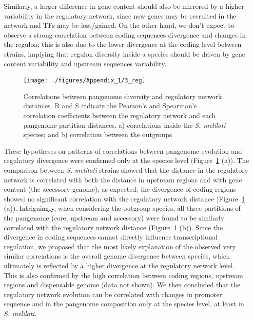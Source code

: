 Similarly, a larger difference in gene content should also be mirrored by a higher variability in the regulatory network, since new genes may be recruited in the network and TFs may be lost/gained.
 On the other hand, we don't expect to observe a strong correlation between coding sequences divergence and changes in the regulon; this is also due to the lower divergence at the coding level between strains, implying that regulon diversity inside a species should be driven by gene content variability and upstream sequences variability. 
\begin{figure}[!tb]
	\centering
	\texttt{[image: ./figures/Appendix\_1/3\_reg]}
  	\caption{\label{fig:reg3} Correlations between pangenome diversity and regulatory network distances. R and S indicate the Pearson's and Spearman's correlation coefficients between the regulatory network and each pangenome partition distances. a) correlations inside the \textit{S. meliloti} species; and b) correlation between the outgroups}
\end{figure}
These hypotheses on patterns of correlations between pangenome evolution and regulatory divergence were confirmed only at the species level (Figure~\ref{fig:reg3} (a)).
 The comparison between \textit{S. meliloti} strains showed that the distance in the regulatory network is correlated with both the distance in upstream regions and with gene content (the accessory genome); as expected, the divergence of coding regions showed no significant correlation with the regulatory network distance (Figure~\ref{fig:reg3} (a)). 
Intriguingly, when considering the outgroup species, all three partitions of the pangenome (core, upstream and accessory) were found to be similarly correlated with the regulatory network distance (Figure~\ref{fig:reg3} (b)).
 Since the divergence in coding sequences cannot directly influence transcriptional regulation, we proposed that the most likely explanation of the observed very similar correlations is the overall genome divergence between species, which ultimately is reflected by a higher divergence at the regulatory network level.
 This is also confirmed by the high correlation between coding regions, upstream regions and dispensable genome (data not shown).
 We then concluded that the regulatory network evolution can be correlated with changes in promoter sequence and in the pangenome composition only at the species level, at least in \textit{S. meliloti}.

